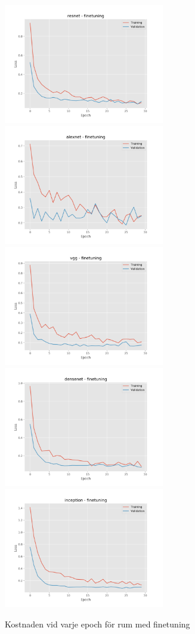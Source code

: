 \documentclass[]{kththesis}
\begin{document}
\begin{figure}[h]
  \includegraphics[width=7cm]{r_l_resnet_fine}
  \includegraphics[width=7cm]{r_l_alexnet_fine}
  \includegraphics[width=7cm]{r_l_vgg_fine}
  \includegraphics[width=7cm]{r_l_densenet_fine}
  \includegraphics[width=7cm]{r_l_inception_fine}
  \caption{Kostnaden vid varje epoch för rum med finetuning}
  \label{fig:r_l_2}
\end{figure}
\end{document}
